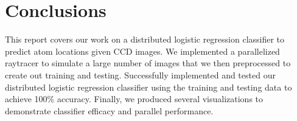 \section{Conclusions}
\label{conclusion}
This report covers our work on a distributed logistic regression classifier to predict atom locations given CCD images.  We implemented a parallelized raytracer to simulate a large number of images that we then preprocessed to create out training and testing.  Successfully implemented and tested our distributed logistic regression classifier using the training and testing data to achieve 100\% accuracy.  Finally, we produced several visualizations to demonstrate classifier efficacy and parallel performance.